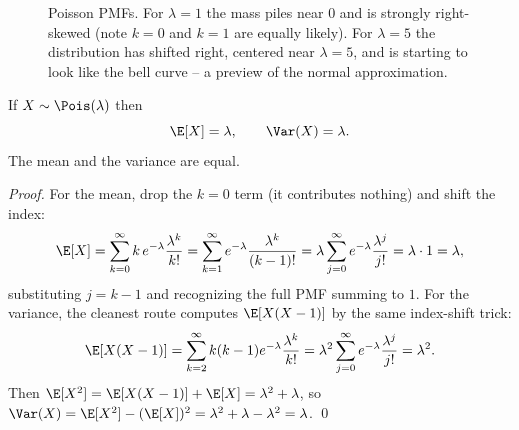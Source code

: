 \begin{figure}[H]
\centering
{}
\caption{Poisson PMFs. For $\lambda=1$ the mass piles near $0$ and is strongly
right-skewed (note $k=0$ and $k=1$ are equally likely). For $\lambda=5$ the
distribution has shifted right, centered near $\lambda=5$, and is starting to look
like the bell curve -- a preview of the normal approximation.}
\label{ch07:fig-pois-pmf}
\end{figure}

\begin{proposition}
\label{ch07:pois-mv}
If $X \sim \Pois(\lambda)$ then
\[
  \E[X] = \lambda, \qquad \Var(X) = \lambda.
\]
The mean and the variance are equal.
\end{proposition}

\begin{proof}
For the mean, drop the $k=0$ term (it contributes nothing) and shift the index:
\[
  \E[X] = \sum_{k=0}^{\infty} k\, e^{-\lambda}\frac{\lambda^k}{k!}
        = \sum_{k=1}^{\infty} e^{-\lambda}\frac{\lambda^k}{(k-1)!}
        = \lambda \sum_{j=0}^{\infty} e^{-\lambda}\frac{\lambda^{j}}{j!}
        = \lambda \cdot 1 = \lambda,
\]
substituting $j = k-1$ and recognizing the full PMF summing to $1$. For the
variance, the cleanest route computes $\E[X(X-1)]$ by the same index-shift trick:
\[
  \E[X(X-1)] = \sum_{k=2}^{\infty} k(k-1) e^{-\lambda}\frac{\lambda^k}{k!}
  = \lambda^2 \sum_{j=0}^{\infty} e^{-\lambda}\frac{\lambda^{j}}{j!}
  = \lambda^2.
\]
Then $\E[X^2] = \E[X(X-1)] + \E[X] = \lambda^2 + \lambda$, so
$\Var(X) = \E[X^2] - (\E[X])^2 = \lambda^2 + \lambda - \lambda^2 = \lambda$. \qed
\end{proof}

